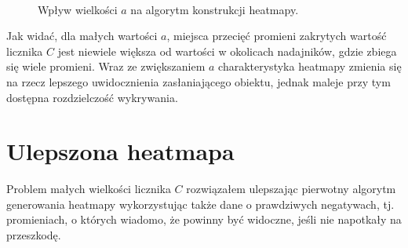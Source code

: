 \begin{sidewaysfigure}[tbh]
  \myfloatalign
   \quad
   \\
   \quad
  \caption[Wpływ wielkości $a$ na algorytm konstrukcji heatmapy.]{Wpływ wielkości $a$ na algorytm konstrukcji heatmapy.}\label{fig:scene_heatmap_size}
\end{sidewaysfigure}


Jak widać, dla małych wartości $a$, miejsca przecięć promieni zakrytych wartość licznika $C$ jest niewiele większa od wartości w okolicach nadajników, gdzie zbiega się wiele promieni. Wraz ze zwiększaniem $a$ charakterystyka heatmapy zmienia się na rzecz lepszego uwidocznienia zasłaniającego obiektu, jednak maleje przy tym dostępna rozdzielczość wykrywania.\\

\section{Ulepszona heatmapa}

Problem małych wielkości licznika $C$ rozwiązałem ulepszając pierwotny algorytm generowania heatmapy wykorzystując także dane o prawdziwych negatywach, tj. promieniach, o których wiadomo, że powinny być widoczne, jeśli nie napotkały na przeszkodę.


